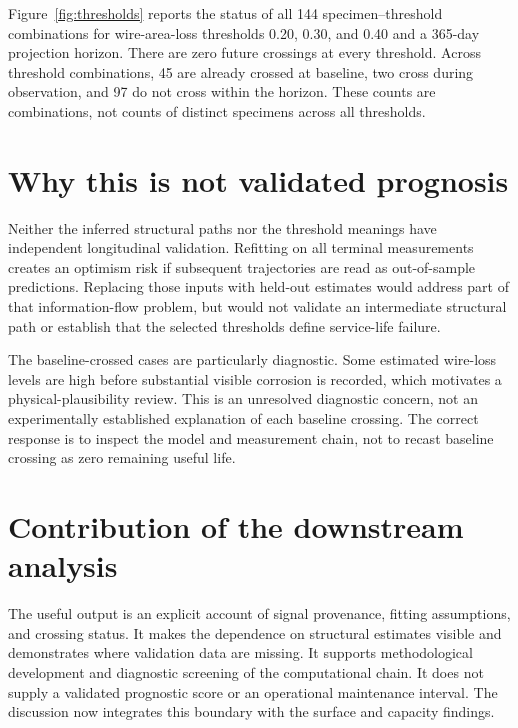 Figure~\ref{fig:thresholds} reports the status of all 144 specimen--threshold combinations for wire-area-loss thresholds 0.20, 0.30, and 0.40 and a 365-day projection horizon. There are zero future crossings at every threshold. Across threshold combinations, 45 are already crossed at baseline, two cross during observation, and 97 do not cross within the horizon. These counts are combinations, not counts of distinct specimens across all thresholds.


\FloatBarrier
\section{Why this is not validated prognosis}
Neither the inferred structural paths nor the threshold meanings have independent longitudinal validation. Refitting on all terminal measurements creates an optimism risk if subsequent trajectories are read as out-of-sample predictions. Replacing those inputs with held-out estimates would address part of that information-flow problem, but would not validate an intermediate structural path or establish that the selected thresholds define service-life failure.

The baseline-crossed cases are particularly diagnostic. Some estimated wire-loss levels are high before substantial visible corrosion is recorded, which motivates a physical-plausibility review. This is an unresolved diagnostic concern, not an experimentally established explanation of each baseline crossing. The correct response is to inspect the model and measurement chain, not to recast baseline crossing as zero remaining useful life.

\section{Contribution of the downstream analysis}
The useful output is an explicit account of signal provenance, fitting assumptions, and crossing status. It makes the dependence on structural estimates visible and demonstrates where validation data are missing. It supports methodological development and diagnostic screening of the computational chain. It does not supply a validated prognostic score or an operational maintenance interval. The discussion now integrates this boundary with the surface and capacity findings.
